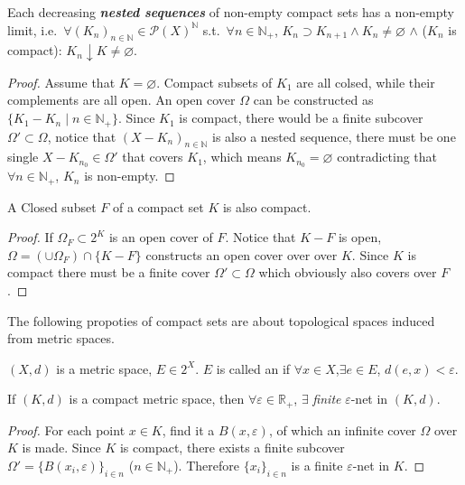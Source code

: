\documentclass[openany]{book}
\begin{document}
\begin{theorem}\label{theorem: compact nested sequences have non-empty limit}
	Each decreasing \emph{\textbf{nested sequences}} of non-empty compact sets has a non-empty limit, i.e.\ 
	$\forall (K_n)_{n \in \mathbb N} \in \mathscr P(X)^\mathbb N$ s.t.\ $\forall n \in \mathbb N_+$, $K_n \supset K_{n+1}\wedge K_n \neq \varnothing$ $\wedge$ ($K_n$ is compact): 
	$K_n \downarrow K \neq \varnothing$.
\end{theorem}
\begin{proof}
	Assume that $K = \varnothing$. 
	Compact subsets of $K_1$ are all colsed, while their complements are all open. An open cover $\varOmega$ can be constructed as $\{K_1 - K_n \mid n \in \mathbb N_+\}$. 
	Since $K_1$ is compact, there would be a finite subcover $\varOmega' \subset \varOmega$, notice that $(X - K_n)_{n \in \mathbb N}$ is also a nested sequence, there must be one single $X - K_{n_0} \in \varOmega'$ that covers $K_1$, which means $K_{n_0} = \varnothing$ contradicting that $\forall n \in \mathbb N_+$, $K_n$ is non-empty.
\end{proof}

\begin{theorem}\label{theorem: closed subset of compact set}
	A Closed subset $F$ of a compact set $K$ is also compact.
\end{theorem}
\begin{proof}
	If $\varOmega_F \subset 2^K$ is an open cover of $F$. 
	Notice that $K - F$ is open, $\varOmega = (\cup \varOmega_F) \cap \{K - F\}$ constructs an open cover over over $K$. 
	Since $K$ is compact there must be a finite cover $\varOmega' \subset \varOmega$ which obviously also covers over $F$.
\end{proof}

The following propoties of compact sets are about topological spaces induced from metric spaces.

\begin{definition}[net]\label{defintion: e-net}
	$(X, d)$ is a metric space, $E \in 2^X$. 
	$E$ is called an  if $\forall x \in X$,$\exists e \in E$, $d(e, x) < \varepsilon$.
\end{definition}

\begin{theorem}\label{theorem: finite e-net exists (metric, compact)}
	If $(K, d)$ is a compact metric space, then $\forall \varepsilon \in \mathbb R_+$, $\exists$ \emph{finite} $\varepsilon$-net in $(K, d)$. 
\end{theorem}
\begin{proof}
	For each point $x\in K$, find it a $B(x,\varepsilon)$, of which an infinite cover $\Omega$ over $K$ is made. 
	Since $K$ is compact, there exists a finite subcover $\varOmega' = \{B(x_i,\varepsilon)\}_{i \in n}$ ($n \in \mathbb N_+$). Therefore $\{x_i\}_{i \in n}$ is a finite $\varepsilon$-net in $K$.
\end{proof}
\end{document}
